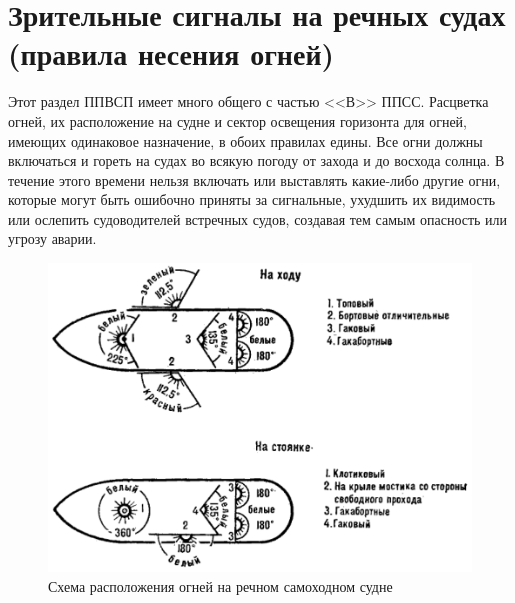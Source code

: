 \documentclass[a4paper, 12pt, twoside, final]{scrbook}
\begin{document}
\section{Зрительные сигналы на речных судах (правила несения огней)}

Этот раздел ППВСП имеет много общего с частью <<В>> ППСС. Расцветка огней, их расположение на судне и сектор освещения горизонта для огней, имеющих одинаковое назначение, в обоих правилах едины. Все огни должны включаться и гореть на судах во всякую погоду от захода и до восхода солнца. В течение этого времени нельзя включать или выставлять какие-либо другие огни, которые могут быть ошибочно приняты за сигнальные, ухудшить их видимость или ослепить судоводителей встречных судов, создавая тем самым опасность или угрозу аварии.

\begin{figure}[htbp]
   \centering
   \includegraphics{143_Shema_rasp_ognej} %
   \caption{Схема расположения огней на речном самоходном судне}
   \label{fig:143}
\end{figure}
\end{document}
